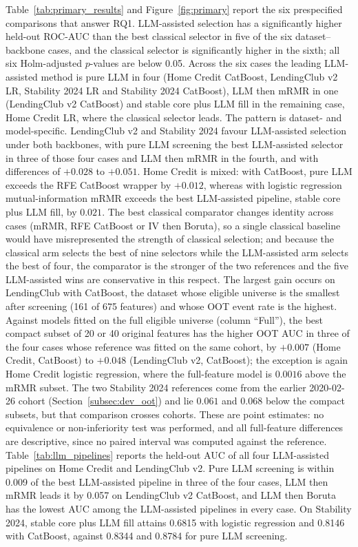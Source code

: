 \documentclass[final,5p,twocolumn]{elsarticle}
\begin{document}
Table~\ref{tab:primary_results} and Figure~\ref{fig:primary} report the six prespecified comparisons that answer RQ1. LLM-assisted selection has a significantly higher held-out ROC-AUC than the best classical selector in five of the six dataset--backbone cases, and the classical selector is significantly higher in the sixth; all six Holm-adjusted $p$-values are below 0.05. Across the six cases the leading LLM-assisted method is pure LLM in four (Home Credit CatBoost, LendingClub v2 LR, Stability 2024 LR and Stability 2024 CatBoost), LLM then mRMR in one (LendingClub v2 CatBoost) and stable core plus LLM fill in the remaining case, Home Credit LR, where the classical selector leads. The pattern is dataset- and model-specific. LendingClub v2 and Stability 2024 favour LLM-assisted selection under both backbones, with pure LLM screening the best LLM-assisted selector in three of those four cases and LLM then mRMR in the fourth, and with differences of $+0.028$ to $+0.051$. Home Credit is mixed: with CatBoost, pure LLM exceeds the RFE CatBoost wrapper by $+0.012$, whereas with logistic regression mutual-information mRMR exceeds the best LLM-assisted pipeline, stable core plus LLM fill, by $0.021$. The best classical comparator changes identity across cases (mRMR, RFE CatBoost or IV then Boruta), so a single classical baseline would have misrepresented the strength of classical selection; and because the classical arm selects the best of nine selectors while the LLM-assisted arm selects the best of four, the comparator is the stronger of the two references and the five LLM-assisted wins are conservative in this respect. The largest gain occurs on LendingClub with CatBoost, the dataset whose eligible universe is the smallest after screening (161 of 675 features) and whose OOT event rate is the highest. Against models fitted on the full eligible universe (column ``Full''), the best compact subset of 20 or 40 original features has the higher OOT AUC in three of the four cases whose reference was fitted on the same cohort, by $+0.007$ (Home Credit, CatBoost) to $+0.048$ (LendingClub v2, CatBoost); the exception is again Home Credit logistic regression, where the full-feature model is $0.0016$ above the mRMR subset. The two Stability 2024 references come from the earlier 2020-02-26 cohort (Section~\ref{subsec:dev_oot}) and lie $0.061$ and $0.068$ below the compact subsets, but that comparison crosses cohorts. These are point estimates: no equivalence or non-inferiority test was performed, and all full-feature differences are descriptive, since no paired interval was computed against the reference. Table~\ref{tab:llm_pipelines} reports the held-out AUC of all four LLM-assisted pipelines on Home Credit and LendingClub v2. Pure LLM screening is within 0.009 of the best LLM-assisted pipeline in three of the four cases, LLM then mRMR leads it by 0.057 on LendingClub v2 CatBoost, and LLM then Boruta has the lowest AUC among the LLM-assisted pipelines in every case. On Stability 2024, stable core plus LLM fill attains 0.6815 with logistic regression and 0.8146 with CatBoost, against 0.8344 and 0.8784 for pure LLM screening.
\end{document}
